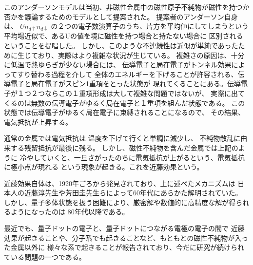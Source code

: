 \documentclass[letterpaper,10pt,dvipdfmx]{sphinxhowto}
\begin{document}
このアンダーソンモデルは当初、非磁性金属中の磁性原子不純物が磁性を持つか否かを議論するためのモデルとして提案された。
提案者のアンダーソン自身は、
\(Un_{d\uparrow}n_{d\downarrow}\)
の２つの電子数演算子のうち、片方を平均値にしてしまうという平均場近似で、あるUの値を境に磁性を持つ場合と持たない場合に
区別されるということを提唱した。
しかし、このような不連続性は近似が単純であったために生じており、実際はより複雑な状況が生じている。
複雑さの原因は、十分に低温で熱ゆらぎが少ない場合には、
伝導電子と局在電子がトンネル効果によってすり替わる過程を介して
全体のエネルギーを下げることが許容される、伝導電子と局在電子がスピン1重項をとった状態が
現れてくることにある。伝導電子が１つ２つならこの１重項形成は大して複雑な問題ではないが、
実際に出てくるのは無数の伝導電子がゆるく局在電子と１重項を組んだ状態である。
この状態では伝導電子がゆるく局在電子に束縛されることになるので、
その結果、電気抵抗が上昇する。

通常の金属では電気抵抗は
温度を下げて行くと単調に減少し、
不純物散乱に由来する残留抵抗が最後に残る。
しかし、磁性不純物を含んだ金属では上記のように
冷やしていくと、一旦さがったのちに電気抵抗が上がるという、電気抵抗に極小点が現れる
という現象が起きる。これを近藤効果という。

近藤効果自体は、1920年ごろから発見されており、上に述べたメカニズムは
日本人の近藤淳先生や芳田圭先生らによって60年代にあらかた解明されていた。
しかし、量子多体状態を扱う困難により、厳密解や数値的に高精度な解が得られるようになったのは
80年代以降である。

最近でも、量子ドットの電子と、量子ドットにつながる電極の電子の間で
近藤効果が起きることや、分子系でも起きることなど、もともとの磁性不純物が入った金属以外に
様々な系で起きることが報告されており、今だに研究が続けられている問題の一つである。
\end{document}
